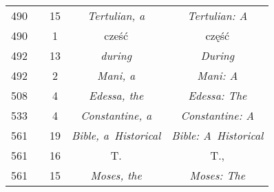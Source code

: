 \documentclass[a4paper,11pt]{article}
\begin{document}
\begin{center}
\begin{tabular}{|c|c|c|c|c|}
    490 & & 15 & \textit{Tertulian, a} & \textit{Tertulian: A} \\
    490 & & \hphantom{0}1 & cześć & część \\
    492 & & 13 & \textit{during} & \textit{During} \\
    492 & & \hphantom{0}2 & \textit{Mani, a} & \textit{Mani: A} \\
    508 & & \hphantom{0}4 & \textit{Edessa, the} & \textit{Edessa: The} \\
    533 & & \hphantom{0}4 & \textit{Constantine, a}
    & \textit{Constantine: A} \\
    561 & & 19 & \textit{Bible, a~Historical}
           & \textit{Bible: A~Historical} \\
    561 & & 16 & T. & T., \\
    561 & & 15 & \textit{Moses, the} & \textit{Moses: The} \\
    \hline
  \end{tabular}





  \newpage


\end{center}
\end{document}
